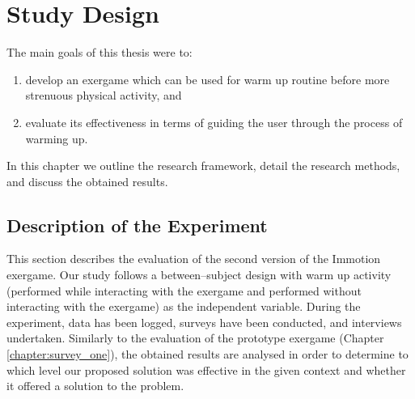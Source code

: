 \chapter{Study Design}
\label{chapter:studydesign}
The main goals of this thesis were to:
\begin{enumerate}
\item develop an exergame which can be used for warm up routine before more strenuous physical activity, and
\item evaluate its effectiveness in terms of guiding the user through the process of warming up.
\end{enumerate} In this chapter we outline the research framework, detail the research methods, and discuss the obtained results.
\section{Description of the Experiment}
This section describes the evaluation of the second version of the Immotion exergame. Our study follows a between–subject design with warm up activity (performed while
interacting with the exergame and performed without interacting with the exergame) as the independent
variable. During the experiment, data has been logged, surveys have been conducted, and interviews undertaken. Similarly to the evaluation of the prototype exergame (Chapter \ref{chapter:survey_one}), the obtained results are analysed in order to determine to which level our proposed solution was effective in the given context and whether it offered a solution to the problem. %

